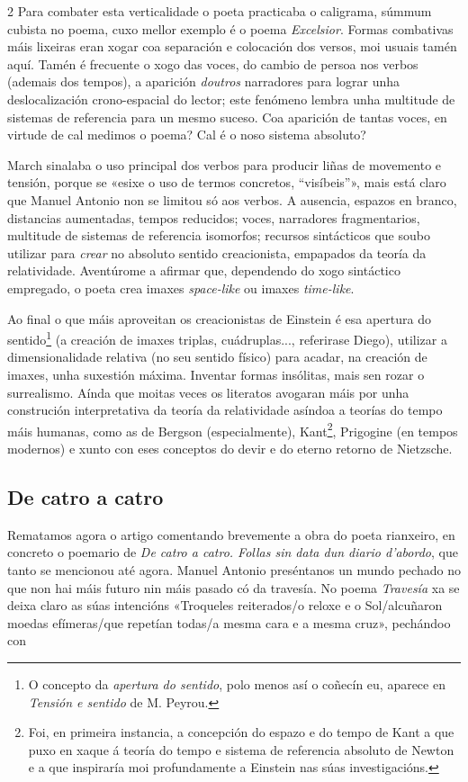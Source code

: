\begin{multicols}{2}
Para combater esta verticalidade o poeta practicaba o caligrama, súmmum cubista
no poema, cuxo mellor exemplo é o poema \textit{Excelsior}. Formas combativas
máis lixeiras eran xogar coa separación e colocación dos versos, moi usuais
tamén aquí. Tamén é frecuente o xogo das voces, do cambio de persoa nos verbos
(ademais dos tempos), a aparición \textit{doutros} narradores para lograr
unha deslocalización crono-espacial do lector; este fenómeno lembra unha
multitude de sistemas de referencia para un mesmo suceso. Coa aparición de
tantas voces, en virtude de cal medimos o poema? Cal é o noso sistema
absoluto?

March sinalaba o uso principal dos verbos para producir liñas de movemento e
tensión, porque se «esixe o uso de termos concretos, ``visíbeis''»,
mais está claro que Manuel Antonio non se limitou só aos verbos. A ausencia,
espazos en branco, distancias aumentadas, tempos reducidos; voces, narradores
fragmentarios, multitude de sistemas de referencia isomorfos; recursos
sintácticos que soubo utilizar para \textit{crear} no absoluto sentido
creacionista, empapados da teoría da relatividade. Aventúrome a afirmar que,
dependendo do xogo sintáctico empregado, o poeta crea imaxes
\textit{space-like} ou imaxes \textit{time-like}.

Ao final o que máis aproveitan os creacionistas de Einstein é esa apertura do
sentido\footnote{O concepto da \textit{apertura do sentido}, polo menos así o
coñecín eu, aparece en \textit{Tensión e sentido} de M. Peyrou.} (a creación de
imaxes triplas, cuádruplas..., referirase Diego), utilizar a dimensionalidade
relativa (no seu sentido físico) para acadar, na creación de imaxes, unha
suxestión máxima. Inventar formas insólitas, mais sen rozar o surrealismo.
Aínda que moitas veces os literatos avogaran máis por unha construción
interpretativa da teoría da relatividade asíndoa a teorías do tempo máis
humanas, como as de Bergson (especialmente), Kant\footnote{Foi, en primeira
instancia, a concepción do espazo e do tempo de Kant a que puxo en xaque á
teoría do tempo e sistema de referencia absoluto de Newton e a que inspiraría
moi profundamente a Einstein nas súas investigacións.}, Prigogine (en tempos
modernos) e xunto con eses conceptos do devir e do eterno retorno de Nietzsche.

\subsection*{De catro a catro}

Rematamos agora o artigo comentando brevemente a obra do poeta rianxeiro, en
concreto o poemario de \textit{De catro a catro. Follas sin data dun diario
d'abordo}, que tanto se mencionou até agora. Manuel Antonio preséntanos un
mundo pechado no que non hai máis futuro nin máis pasado có da travesía. No
poema \textit{Travesía} xa se deixa claro as súas intencións
«Troqueles reiterados/o reloxe e o Sol/alcuñaron moedas efímeras/que
repetían todas/a mesma cara e a mesma cruz», pechándoo con


\end{multicols}
